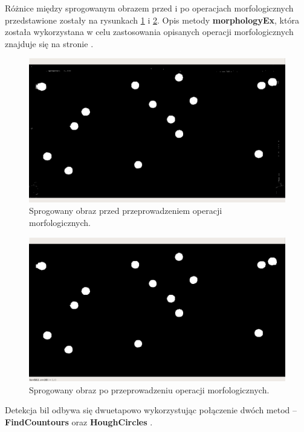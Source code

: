 \documentclass[12pt]{article}
\begin{document}
    Różnice między sprogowanym obrazem przed i po operacjach morfologicznych przedstawione zostały na rysunkach \ref{thresh_before_morph} i \ref{thresh_after_morph}. Opis metody \textbf{morphologyEx}, która została wykorzystana w celu zastosowania opisanych operacji morfologicznych znajduje się na stronie \cite{morphologyEx}.

    \begin{figure}[h]
        \centering
        \includegraphics[width=15cm]{./images/obrazki/bp/thresh_before_morph.png}
        \caption{Sprogowany obraz przed przeprowadzeniem operacji morfologicznych.}
        \label{thresh_before_morph}
    \end{figure}

    \begin{figure}[h]
        \centering
        \includegraphics[width=15cm]{./images/obrazki/bp/thresh_contours.png}
        \caption{Sprogowany obraz po przeprowadzeniu operacji morfologicznych.}
        \label{thresh_after_morph}
    \end{figure}
    
    Detekcja bil odbywa się dwuetapowo wykorzystując połączenie dwóch metod – \textbf{FindCountours} \cite{FindContours} oraz \textbf{HoughCircles} \cite{HoughCircles}.
\end{document}
